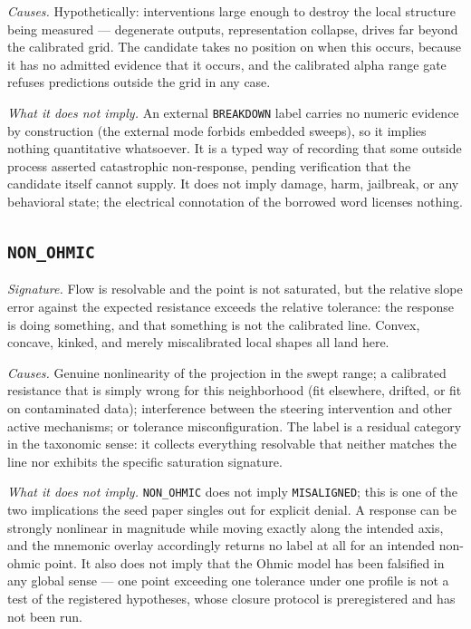 \emph{Causes.} Hypothetically: interventions large enough to destroy the
local structure being measured --- degenerate outputs, representation
collapse, drives far beyond the calibrated grid. The candidate takes no
position on when this occurs, because it has no admitted evidence that it
occurs, and the calibrated alpha range gate refuses predictions outside the
grid in any case.

\emph{What it does not imply.} An external \texttt{BREAKDOWN} label carries
no numeric evidence by construction (the external mode forbids embedded
sweeps), so it implies nothing quantitative whatsoever. It is a typed way of
recording that some outside process asserted catastrophic non-response,
pending verification that the candidate itself cannot supply. It does not
imply damage, harm, jailbreak, or any behavioral state; the electrical
connotation of the borrowed word licenses nothing.

\subsection{\texttt{NON\_OHMIC}}\label{ch07:sec:region-nonohmic}

\emph{Signature.} Flow is resolvable and the point is not saturated, but the
relative slope error against the expected resistance exceeds the relative
tolerance: the response is doing something, and that something is not the
calibrated line. Convex, concave, kinked, and merely miscalibrated local
shapes all land here.

\emph{Causes.} Genuine nonlinearity of the projection in the swept range; a
calibrated resistance that is simply wrong for this neighborhood (fit
elsewhere, drifted, or fit on contaminated data); interference between the
steering intervention and other active mechanisms; or tolerance
misconfiguration. The label is a residual category in the taxonomic sense:
it collects everything resolvable that neither matches the line nor exhibits
the specific saturation signature.

\emph{What it does not imply.} \texttt{NON\_OHMIC} does not imply
\texttt{MISALIGNED}; this is one of the two implications the seed paper
singles out for explicit denial. A response can be strongly nonlinear in
magnitude while moving exactly along the intended axis, and the mnemonic
overlay accordingly returns no label at all for an intended non-ohmic point.
It also does not imply that the Ohmic model has been falsified in any global
sense --- one point exceeding one tolerance under one profile is not a test
of the registered hypotheses, whose closure protocol is preregistered and has
not been run.

